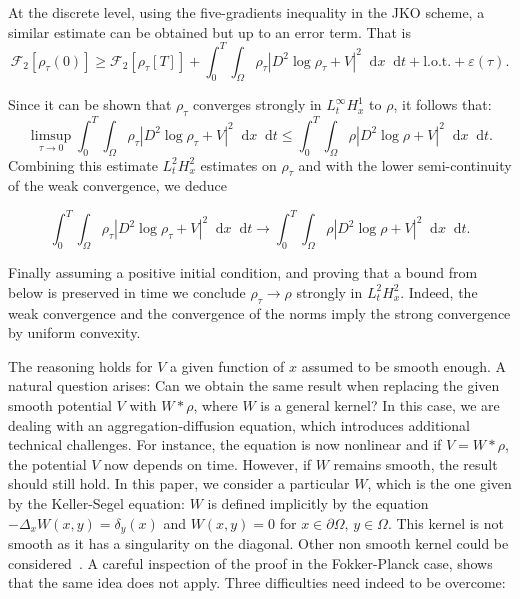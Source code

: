 \documentclass[a4paper,twosided, 11pt]{article}
\newcommand{\eps}{\varepsilon}
\newcommand {\p}   {\partial}
\theoremstyle{plain}
\theoremstyle{remark}
\newcommand{\diff}{\mathop{}\!\mathrm{d}}
\numberwithin{equation}{section}
\begin{document}
At the discrete level, using the five-gradients inequality in the JKO scheme, a similar estimate can be obtained but up to an error term. That is 
$$
\mathcal{F}_{2}[\rho_{\tau}(0)]\ge \mathcal{F}_{2}[\rho_{\tau}[T]] + \int_{0}^{T}\int_{\Omega} \rho_{\tau} |D^{2}\log\rho_{\tau}+V|^2 \diff x \diff t + \text{l.o.t.} + \eps(\tau).
$$

 Since it can be shown that $\rho_{\tau}$ converges strongly in $L^{\infty}_{t}H^1_{x}$ to $\rho$, it follows that:
\[
\limsup_{\tau\to 0}\int_{0}^{T}\int_{\Omega} \rho_{\tau} |D^{2}\log\rho_{\tau}+V|^2 \diff x \diff t  \le \int_{0}^{T}\int_{\Omega} \rho |D^{2}\log\rho+V|^2\diff x \diff t .
\]
Combining this estimate $L^{2}_{t}H^{2}_x$ estimates on $\rho_{\tau}$ and with the lower semi-continuity of the weak convergence, we deduce

\[
\int_{0}^{T}\int_{\Omega} \rho_{\tau} |D^{2}\log\rho_{\tau}+V|^2 \diff x \diff t \to \int_{0}^{T}\int_{\Omega} \rho |D^{2}\log\rho+V|^2 \diff x \diff t .
\]

Finally assuming a positive initial condition, and proving that a bound from below is preserved in time we conclude $\rho_{\tau} \to \rho$ strongly in $L^{2}_t H^{2}_x$. Indeed, the weak convergence and the convergence of the norms imply the strong convergence by uniform convexity.

The reasoning holds for $V$ a given function of $x$ assumed to be smooth enough. A natural question arises: Can we obtain the same result when replacing the given smooth potential $V$ with $W \ast \rho$, where $W$ is a general kernel? In this case, we are dealing with an aggregation-diffusion equation, which introduces additional technical challenges. For instance, the equation is now nonlinear and if $V = W \ast \rho$, the potential $V$ now depends on time. However, if $W$ remains smooth, the result should still hold.  In this paper, we consider a particular $W$, which is the one given by the Keller-Segel equation: $W$ is defined implicitly by the equation $-\Delta_{x} W(x,y) = \delta_{y}(x)$ and $W(x,y)=0$ for $x\in\p\Omega, \, y\in\Omega$. This kernel is not smooth as it has a singularity on the diagonal. Other non smooth kernel could be considered~\cite{2024arXiv240609227C}. A careful inspection of the proof in the Fokker-Planck case, shows that the same idea does not apply. Three difficulties need indeed to be overcome:
\end{document}
